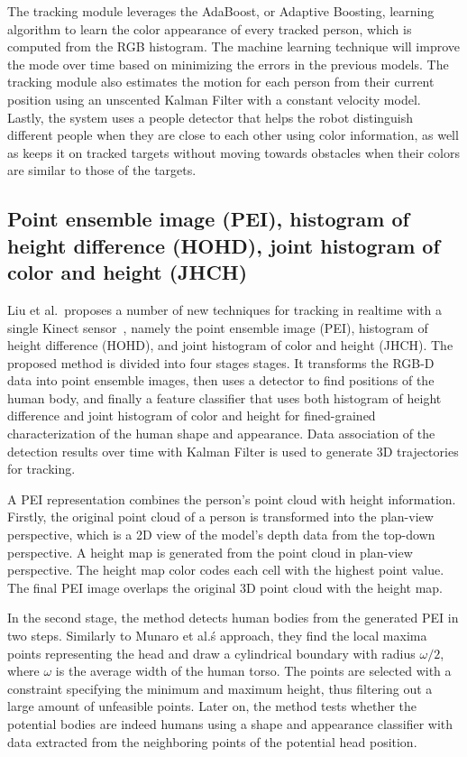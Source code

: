 The tracking module leverages the AdaBoost, or Adaptive Boosting, learning algorithm to learn the color appearance of every tracked person, which is computed from the RGB histogram. The machine learning technique will improve the mode over time based on minimizing the errors in the previous models. The tracking module also estimates the motion for each person from their current position using an unscented Kalman Filter with a constant velocity model. Lastly, the system uses a people detector that helps the robot distinguish different people when they are close to each other using color information, as well as keeps it on tracked targets without moving towards obstacles when their colors are similar to those of the targets.

\subsection{Point ensemble image (PEI), histogram of height difference (HOHD), joint histogram of color and height (JHCH)}

Liu et al.\ proposes a number of new techniques for tracking in realtime with a single Kinect sensor~\cite{liu_tracking_with_pei}, namely the point ensemble image (PEI), histogram of height difference (HOHD), and joint histogram of color and height (JHCH). The proposed method is divided into four stages stages. It transforms the RGB-D data into point ensemble images, then uses a detector to find positions of the human body, and finally a feature classifier that uses both histogram of height difference and joint histogram of color and height for fined-grained characterization of the human shape and appearance. Data association of the detection results over time with Kalman Filter is used to generate 3D trajectories for tracking.

A PEI representation combines the person's point cloud with height information. Firstly, the original point cloud of a person is transformed into the plan-view perspective, which is a 2D view of the model's depth data from the top-down perspective. A height map is generated from the point cloud in plan-view perspective. The height map color codes each cell with the highest point value. The final PEI image overlaps the original 3D point cloud with the height map.

In the second stage, the method detects human bodies from the generated PEI in two steps. Similarly to Munaro et al.\'s approach, they find the local maxima points representing the head and draw a cylindrical boundary with radius $\omega/2$, where $\omega$ is the average width of the human torso. The points are selected with a constraint specifying the minimum and maximum height, thus filtering out a large amount of unfeasible points. Later on, the method tests whether the potential bodies are indeed humans using a shape and appearance classifier with data extracted from the neighboring points of the potential head position.

